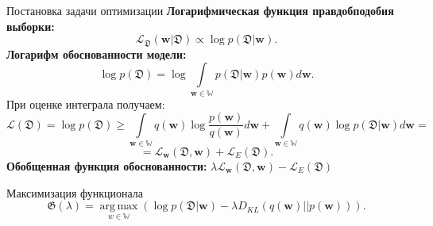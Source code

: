 \documentclass[9pt,pdf,hyperref={unicode}]{beamer}
\DeclareMathOperator*{\argmax}{arg\,max}
\begin{document}
\begin{frame}[shrink=5]{Постановка задачи оптимизации}
    \textbf{Логарифмическая функция правдобподобия выборки:}
		\begin{equation*}
            \mathcal{L}_\mathfrak{D}(\mathbf{w}|\mathfrak{D}) \propto \log p(\mathfrak{D}|\mathbf{w}).
        \end{equation*}	
    \textbf{Логарифм обоснованности модели:}
        \begin{equation*}
            \log p(\mathfrak{D}) = \log \int\limits_{\mathbf{w}\in \mathbb{W}} p(\mathfrak{D}|\mathbf{w})p(\mathbf{w}) d\mathbf{w}.
        \end{equation*}
    При оценке интеграла получаем:
    \begin{equation*}
        \mathcal{L}(\mathfrak{D}) = \log p(\mathfrak{D}) \geq \int\limits_{\mathbf{w}\in \mathbb{W}} q(\mathbf{w}) \log \frac{p(\mathbf{w})}{q(\mathbf{w})}d\mathbf{w} + \int\limits_{\mathbf{w}\in \mathbb{W}} q(\mathbf{w}) \log p(\mathfrak{D}|\mathbf{w})d\mathbf{w} =
    \end{equation*}
    \begin{equation*}
     = \mathcal{L}_{\mathbf{w}}(\mathfrak{D}, \mathbf{w}) + \mathcal{L}_E (\mathfrak{D}).
    \end{equation*}
    \textbf{Обобщенная функция обоснованности:}
    $ \lambda\mathcal{L}_{\mathbf{w}}(\mathfrak{D}, \mathbf{w}) - \mathcal{L}_E (\mathfrak{D})$
    \begin{block}{Максимизация функционала} 
       \begin{equation*}
            \label{nohyper}
            \mathfrak{G}(\lambda) = \argmax\limits_{w \in \mathbb{W}} ( \log p(\mathfrak{D}| \mathbf{w})  - \lambda D_{KL}(q(\mathbf{w})||p(\mathbf{w})) ).
        \end{equation*}
    \end{block}
    
    
\end{frame}
\end{document}
